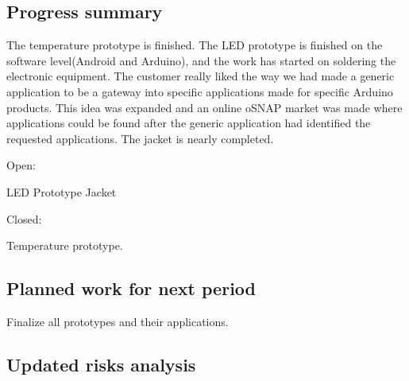 \subsection{Progress summary}

The temperature prototype is finished. The LED prototype is finished on the software level(Android and Arduino), and the work has started on soldering the electronic equipment.
The customer really liked the way we had made a generic application to be a gateway into specific applications made for specific Arduino products. This idea was expanded and an online oSNAP market was made where applications could be found after the generic application had identified the requested applications.
The jacket is nearly completed. 

Open:

LED Prototype
Jacket

Closed:

Temperature prototype.

\subsection{Planned work for next period}

Finalize all prototypes and their applications.

\subsection{Updated risks analysis}
